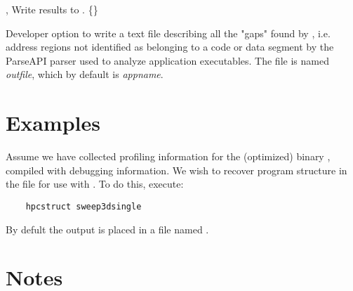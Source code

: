 \documentclass[english]{article}
\begin{document}
\begin{Description}

\item[\OptArg{-o}{file}, \OptArg{--output}{file}]
Write results to .  \{\}


\item[\Opt{--show-gaps}]
Developer option to
write a text file describing all the "gaps" found by ,
i.e. address regions not identified as belonging to a code or data segment
by the ParseAPI parser used to analyze application executables.
The file is named \emph{outfile}, which by default is
\emph{appname}.

\end{Description}

\section{Examples}

Assume we have collected profiling information for the (optimized) binary ,
compiled with debugging information.
We wish to recover program structure in the file 
for use with .
To do this, execute:

\begin{verbatim}
    hpcstruct sweep3dsingle
\end{verbatim}

By defult the output is placed in a file named .

\section{Notes}
\end{document}
